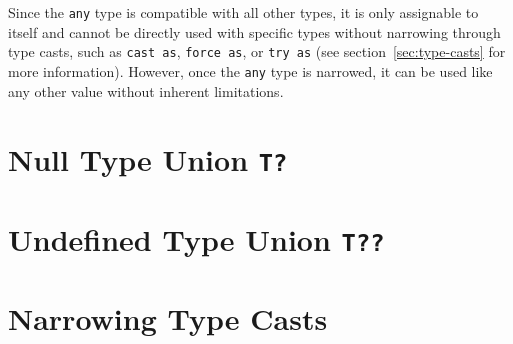 Since the \lstinline|any| type is compatible with all other types, it is only assignable to itself and cannot be directly used with specific types without narrowing through type casts, such as \lstinline|cast as|, \lstinline|force as|, or \lstinline|try as| (see section~\ref{sec:type-casts} for more information). However, once the \lstinline|any| type is narrowed, it can be used like any other value without inherent limitations.

\section{Null Type Union \lstinline|T?|}


\section{Undefined Type Union \lstinline|T??|}


\section{Narrowing Type Casts}


